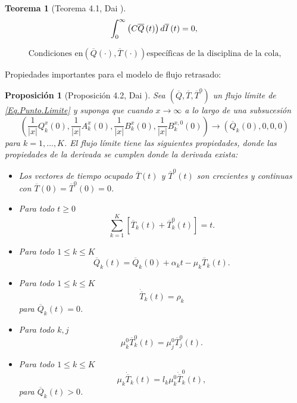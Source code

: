 \documentclass{article}
\newtheorem{Teo}{Teorema}[section]
\newtheorem{Prop}{Proposición}[section]
\numberwithin{equation}{section}
\begin{document}
\begin{Teo}[Teorema 4.1, Dai \cite{Dai}]
\begin{equation}\label{Eq.MF.5.3a}
\int_{0}^{\infty}\left(C\overline{Q}\left(t\right)\right)d\overline{I}\left(t\right)=0,\\
\end{equation}

\begin{equation}\label{Eq.MF.6.3a}
\textrm{Condiciones en
}\left(\overline{Q}\left(\cdot\right),\overline{T}\left(\cdot\right)\right)\textrm{
espec\'ificas de la disciplina de la cola,}
\end{equation}
\end{Teo}


Propiedades importantes para el modelo de flujo retrasado:

\begin{Prop}[Proposici\'on 4.2, Dai \cite{Dai}]
 Sea $\left(\overline{Q},\overline{T},\overline{T}^{0}\right)$ un flujo l\'imite de \ref{Eq.Punto.Limite}
 y suponga que cuando $x\rightarrow\infty$ a lo largo de una subsucesi\'on
\[\left(\frac{1}{|x|}Q_{k}^{x}\left(0\right),\frac{1}{|x|}A_{k}^{x}\left(0\right),\frac{1}{|x|}B_{k}^{x}\left(0\right),\frac{1}{|x|}B_{k}^{x,0}\left(0\right)\right)\rightarrow\left(\overline{Q}_{k}\left(0\right),0,0,0\right)\]
para $k=1,\ldots,K$. El flujo l\'imite tiene las siguientes
propiedades, donde las propiedades de la derivada se cumplen donde
la derivada exista:
\begin{itemize}
 \item[i)] Los vectores de tiempo ocupado $\overline{T}\left(t\right)$ y $\overline{T}^{0}\left(t\right)$ son crecientes y continuas con
$\overline{T}\left(0\right)=\overline{T}^{0}\left(0\right)=0$.
\item[ii)] Para todo $t\geq0$
\[\sum_{k=1}^{K}\left[\overline{T}_{k}\left(t\right)+\overline{T}_{k}^{0}\left(t\right)\right]=t.\]
\item[iii)] Para todo $1\leq k\leq K$
\[\overline{Q}_{k}\left(t\right)=\overline{Q}_{k}\left(0\right)+\alpha_{k}t-\mu_{k}\overline{T}_{k}\left(t\right).\]
\item[iv)]  Para todo $1\leq k\leq K$
\[\dot{{\overline{T}}}_{k}\left(t\right)=\rho_{k}\] para $\overline{Q}_{k}\left(t\right)=0$.
\item[v)] Para todo $k,j$
\[\mu_{k}^{0}\overline{T}_{k}^{0}\left(t\right)=\mu_{j}^{0}\overline{T}_{j}^{0}\left(t\right).\]
\item[vi)]  Para todo $1\leq k\leq K$
\[\mu_{k}\dot{{\overline{T}}}_{k}\left(t\right)=l_{k}\mu_{k}^{0}\dot{{\overline{T}}}_{k}^{0}\left(t\right),\] para $\overline{Q}_{k}\left(t\right)>0$.
\end{itemize}
\end{Prop}
\end{document}
